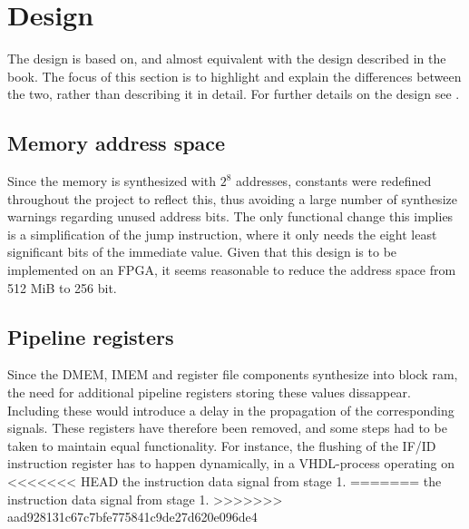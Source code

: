 \section{Design}
The design is based on, and almost equivalent with the design described in the
book. The focus of this section is to highlight and explain the differences
between the two, rather than describing it in detail. For further details on the
design see \cite{patterson12}.
\subsection{Memory address space}
Since the memory is synthesized with $2^8$ addresses, constants were redefined
throughout the project to reflect this, thus avoiding a large number of
synthesize warnings regarding unused address bits. The only functional change
this implies is a simplification of the jump instruction, where it only needs
the eight least significant bits of the immediate value. Given that this design
is to be implemented on an FPGA, it seems reasonable to reduce the address
space from 512 MiB to 256 bit.

\subsection{Pipeline registers}
Since the DMEM, IMEM and register file components synthesize into block ram, the
need for additional pipeline registers storing these values dissappear.
Including these would introduce a delay in the propagation of the corresponding
signals. These registers have therefore been removed, and some steps had to be
taken to maintain equal functionality. For instance, the flushing of the IF/ID
instruction register has to happen dynamically, in a VHDL-process operating on
<<<<<<< HEAD
the instruction data signal from stage 1.
=======
the instruction data signal from stage 1.
>>>>>>> aad928131c67c7bfe775841c9de27d620e096de4
